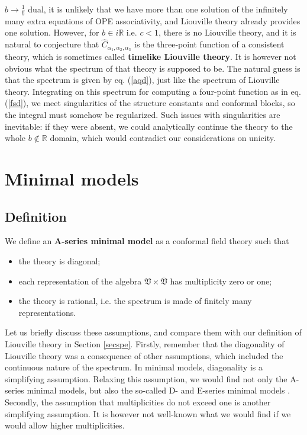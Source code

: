 \documentclass[12pt,a4paper,notitlepage]{report}
\newcommand \R {\mathbb{R}}
\numberwithin{equation}{section}
\theoremstyle{break}
\begin{document}
$b\rightarrow \frac{1}{b}$ dual, it is unlikely that we have more than one solution of the infinitely many extra equations of OPE associativity, and Liouville theory already provides one solution. However, for $b\in i\R$ i.e. $c<1$, there is no Liouville theory, and it is natural to conjecture that $\hat{C}_{\alpha_1,\alpha_2,\alpha_3}$ is the three-point function of a consistent theory, which is sometimes called \textbf{timelike Liouville theory}. It is however not obvious what the spectrum of that theory is supposed to be. The natural guess is that the spectrum is given by eq. (\ref{aqd}), just like the spectrum of Liouville theory. Integrating on this spectrum for computing a four-point function as in eq. (\ref{fsd}), we meet singularities of the structure constants and conformal blocks, so the integral must somehow be regularized. Such issues with singularities are inevitable: if they were absent, we could analytically continue the theory to the whole $b\notin \R$ 
domain, which would contradict our considerations on unicity.


\section{Minimal models \label{secvmm}}

\subsection{Definition}

We define an \textbf{A-series minimal model} as a conformal field theory such that
\begin{itemize}
 \item the theory is diagonal;
\item each representation of the algebra $\mathfrak{V}\times \overline{\mathfrak{V}}$ has multiplicity zero or one;
\item the theory is rational, i.e. the spectrum is made of finitely many representations.
\end{itemize}
Let us briefly discuss these assumptions, and compare them with our definition of Liouville theory in Section \ref{secspe}. Firstly, remember that the diagonality of Liouville theory was a consequence of other assumptions, which included the continuous nature of the spectrum. In minimal models, diagonality is a simplifying assumption. Relaxing this assumption, we would find not only the A-series minimal models, but also the so-called D- and E-series minimal models \cite{fms97}. Secondly, the assumption that multiplicities do not exceed one is another simplifying assumption. It is however not well-known what we would find if we would allow higher multiplicities. 
\end{document}
